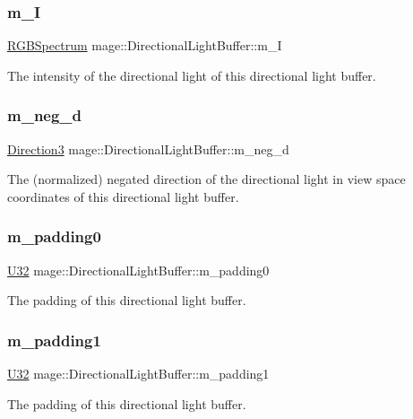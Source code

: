 \subsubsection{\texorpdfstring{m\+\_\+I}{m\_I}}
{\footnotesize\ttfamily \hyperlink{structmage_1_1_r_g_b_spectrum}{R\+G\+B\+Spectrum} mage\+::\+Directional\+Light\+Buffer\+::m\+\_\+I}

The intensity of the directional light of this directional light buffer. \hypertarget{structmage_1_1_directional_light_buffer_af3a1952cf82b66730868573a4b581ab4}{}\label{structmage_1_1_directional_light_buffer_af3a1952cf82b66730868573a4b581ab4} 
\subsubsection{\texorpdfstring{m\+\_\+neg\+\_\+d}{m\_neg\_d}}
{\footnotesize\ttfamily \hyperlink{structmage_1_1_direction3}{Direction3} mage\+::\+Directional\+Light\+Buffer\+::m\+\_\+neg\+\_\+d}

The (normalized) negated direction of the directional light in view space coordinates of this directional light buffer. \hypertarget{structmage_1_1_directional_light_buffer_aac8d40f7af8eac8b2fb79085843be4fd}{}\label{structmage_1_1_directional_light_buffer_aac8d40f7af8eac8b2fb79085843be4fd} 
\subsubsection{\texorpdfstring{m\+\_\+padding0}{m\_padding0}}
{\footnotesize\ttfamily \hyperlink{namespacemage_a41c104c036fba3756a74e19f793eeaa1}{U32} mage\+::\+Directional\+Light\+Buffer\+::m\+\_\+padding0}

The padding of this directional light buffer. \hypertarget{structmage_1_1_directional_light_buffer_ab94c0c42a54c9751dde8a4a2a84da861}{}\label{structmage_1_1_directional_light_buffer_ab94c0c42a54c9751dde8a4a2a84da861} 
\subsubsection{\texorpdfstring{m\+\_\+padding1}{m\_padding1}}
{\footnotesize\ttfamily \hyperlink{namespacemage_a41c104c036fba3756a74e19f793eeaa1}{U32} mage\+::\+Directional\+Light\+Buffer\+::m\+\_\+padding1}

The padding of this directional light buffer. 